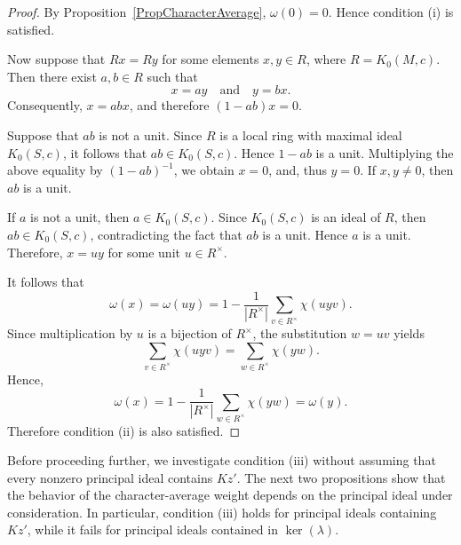 \documentclass[11pt,reqno]{amsart}
\theoremstyle{plain}
\theoremstyle{remark}
\theoremstyle{definition}
\begin{document}
\begin{proof}
By Proposition~\ref{PropCharacterAverage},
\(\omega(0)=0.\)
Hence condition {\rm(i)} is satisfied.

Now suppose that \(Rx=Ry\) for some elements \(x,y\in R\), where
\(R=K_0(M,c)\).
Then there exist \(a,b\in R\) such that
\[x=ay\quad\text{and}\quad y=bx.\]
Consequently,
\(x=abx\), and therefore
\((1-ab)x=0\).

Suppose that \(ab\) is not a unit. Since \(R\) is a local ring with maximal ideal
\(K_0(S,c)\), it follows that \(ab\in K_0(S,c)\). Hence \(1-ab\) is a unit. Multiplying the above equality by \((1-ab)^{-1}\), we obtain \(x=0\), and, thus \(y=0\). 
If \(x,y\neq 0\), then \(ab\) is a unit.

If \(a\) is not a unit, then \(a\in K_0(S,c)\). Since \(K_0(S,c)\) is an ideal of \(R\), then \(ab\in K_0(S,c)\), contradicting the fact that \(ab\) is a unit. Hence \(a\) is a unit. Therefore,
\(x=uy\)
for some unit \(u\in R^\times\).

It follows that
\[\omega(x)=\omega(uy)=1-\frac{1}{|R^\times|}\sum_{v\in R^\times}\chi(uyv).\]
Since multiplication by \(u\) is a bijection of \(R^\times\), the substitution
\(w=uv\)
yields
\[\sum_{v\in R^\times}\chi(uyv)=\sum_{w\in R^\times}\chi(yw).\]
%
%
%
%
Hence,
\[\omega(x)=1-\frac{1}{|R^\times|}\sum_{w\in R^\times}\chi(yw)=\omega(y).\]
Therefore condition {\rm(ii)} is also satisfied.
\end{proof}

Before proceeding further, we investigate condition \rm(iii) without assuming that every nonzero principal ideal contains \(Kz'\). The next two propositions show that the behavior of the character-average weight depends on the principal ideal under consideration. In particular, condition \rm(iii) holds for principal ideals containing \(Kz'\), while it fails for principal ideals contained in \(\ker(\lambda)\).
\end{document}
